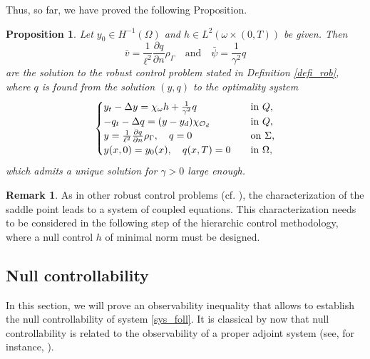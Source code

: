 \documentclass{aims}
\newtheorem{proposition}{Proposition}
\theoremstyle{definition}
\newtheorem{remark}{Remark}
\def\csbd{\rho_{\Gamma}}
\begin{document}
Thus, so far, we have proved the following Proposition.
%
\begin{proposition}
Let $y_0\in H^{-1}(\Omega)$ and $h\in L^2(\omega\times(0,T))$ be given. Then
%
\begin{equation*}
\bar v=\frac{1}{\ell^2}\frac{\partial q}{\partial n}\csbd \quad\text{and}\quad \bar \psi=\frac{1}{\gamma^2}q
\end{equation*}
% 
are the solution to the robust control problem stated in Definition \ref{defi_rob}, where $q$ is found from the solution $(y,q)$ to the optimality system 
%
\begin{equation}\label{sys_foll}
\begin{cases}
y_t-\Delta y= \chi_\omega h+\frac{1}{\gamma^2}q \quad&\textnormal{in }Q, \\
-q_t-\Delta q=(y-y_d)\chi_{\mathcal O_d} \quad& \textnormal{in }Q, \\
y=\frac{1}{\ell^2}\frac{\partial q}{\partial n}\csbd, \quad q=0 \quad &\textnormal{on $\Sigma$,} \\
y(x,0)=y_0(x), \quad q(x,T)=0 \quad &\textnormal{in $\Omega$},
\end{cases}
\end{equation}
%
which admits a unique solution for $\gamma>0$ large enough. 
%
\end{proposition}

\begin{remark}
As in other robust control problems (cf. \cite{aziz,temam_nonlinear}), the characterization of the saddle point leads to a system of coupled equations. This characterization needs to be considered in the following step of the hierarchic control methodology, where a null control $h$ of minimal norm must be designed.
\end{remark}

\subsection{Null controllability}\label{sec_null_1}

In this section, we will prove an observability inequality that allows to establish the null controllability of system \eqref{sys_foll}. It is classical by now that null controllability is related to the observability of a proper adjoint system (see, for instance, \cite{cara_guerrero,zab}). 
\end{document}
